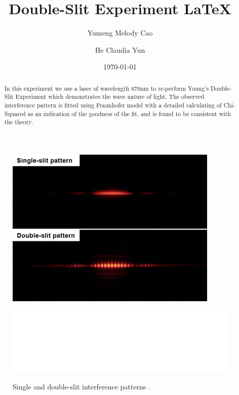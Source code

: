 \documentclass[prb,preprint]{revtex4-1}
\begin{document}
\title{Double-Slit Experiment \LaTeX}

\author{Yumeng Melody Cao}

\author{He Claudia Yun}


\date{\today}


\begin{abstract}
In this experiment we use a laser of wavelength 670nm to re-perform Young's Double-Slit Experiment which demonstrates the wave nature of light. The observed interference pattern is fitted using Fraunhofer model with a detailed calculating of Chi-Squared as an indication of the goodness of the fit, and is found to be consistent with the theory.
\end{abstract}

\begin{figure}[b]
\centering
\includegraphics[width=4in]{image1.jpg}
\caption{Single and double-slit interference patterns \cite{wik}.}
\includegraphics[width=4.5in]{white.png}
\label{image}
\end{figure}
\end{document}
